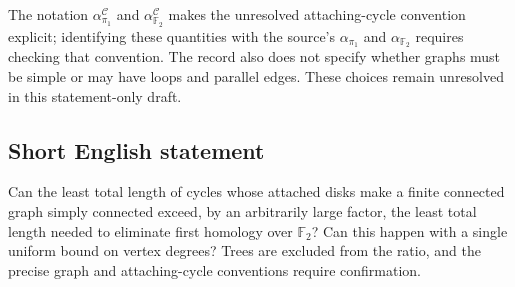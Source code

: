 \documentclass[11pt]{article}
\begin{document}
The notation \(\alpha_{\pi_1}^{\mathcal C}\) and \(\alpha_{\mathbb F_2}^{\mathcal C}\) makes the unresolved attaching-cycle convention explicit; identifying these quantities with the source's \(\alpha_{\pi_1}\) and \(\alpha_{\mathbb F_2}\) requires checking that convention. The record also does not specify whether graphs must be simple or may have loops and parallel edges. These choices remain unresolved in this statement-only draft.
\subsection{Short English statement}
Can the least total length of cycles whose attached disks make a finite connected graph simply connected exceed, by an arbitrarily large factor, the least total length needed to eliminate first homology over \(\mathbb F_2\)? Can this happen with a single uniform bound on vertex degrees? Trees are excluded from the ratio, and the precise graph and attaching-cycle conventions require confirmation.
\end{document}
